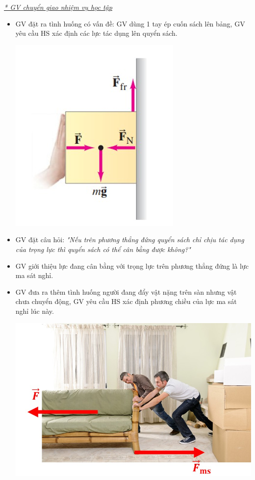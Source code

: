 {\textit{\underline{* GV chuyển giao nhiệm vụ học tập}}
	\begin{itemize}[label=-]
		\item GV đặt ra tình huống có vấn đề: GV dùng 1 tay ép cuốn sách lên bảng, GV yêu cầu HS xác định các lực tác dụng lên quyển sách.
		\begin{center}
			\includegraphics[scale=0.5]{figs/G10-BAI11-7}
		\end{center}
		\item GV đặt câu hỏi: \textit{"Nếu trên phương thẳng đứng quyển sách chỉ chịu tác dụng của trọng lực thì quyển sách có thể cân bằng được không?"}
		\item GV giới thiệu lực đang cân bằng với trọng lực trên phương thẳng đứng là lực ma sát nghỉ.
		\item GV đưa ra thêm tình huống người đang đẩy vật nặng trên sàn nhưng vật chưa chuyển động, GV yêu cầu HS xác định phương chiều của lực ma sát nghỉ lúc này.
		\begin{center}
			\includegraphics[scale=0.5]{figs/G10-BAI11-8}

\end{center}
\end{itemize}}
